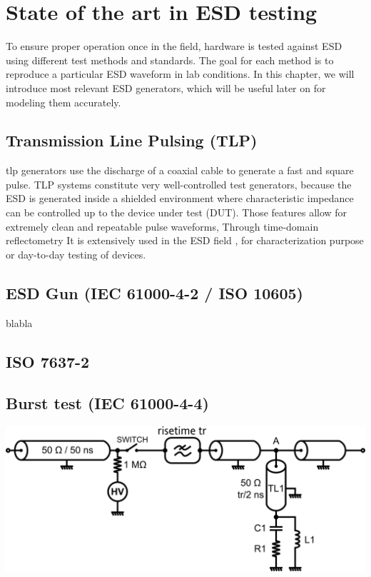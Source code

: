 \section{State of the art in ESD testing}

To ensure proper operation once in the field, hardware is tested against ESD using different test methods and standards.
The goal for each method is to reproduce a particular ESD waveform in lab conditions.
In this chapter, we will introduce most relevant ESD generators, which will be useful later on for modeling them accurately.

\subsection{Transmission Line Pulsing (TLP)}

\gls{tlp} generators use the discharge of a coaxial cable to generate a fast and square pulse.
TLP systems constitute very well-controlled test generators, because the ESD is generated inside a shielded environment where characteristic impedance
can be controlled up to the device under test (DUT).
Those features allow for extremely clean and repeatable pulse waveforms,
Through time-domain reflectometry
It is extensively used in the ESD field \cite{TLP, TLPforESDProtectionCz, TLPthroubleshooting, LacrampeTransientImmunity}, for characterization purpose or day-to-day testing of devices.

\subsection{ESD Gun (IEC 61000-4-2 / ISO 10605)}
blabla

\subsection{ISO 7637-2}

\subsection{Burst test (IEC 61000-4-4)}

\includegraphics[width=\textwidth,height=\textheight,keepaspectratio]{src/2/figures/tlp_iec.png}

